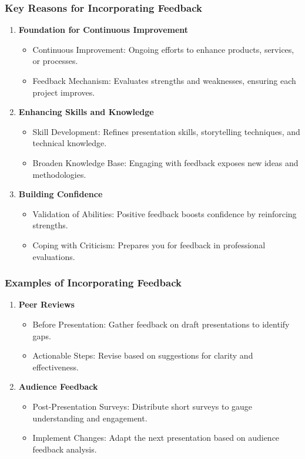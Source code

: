 \documentclass[aspectratio=169]{beamer}
\begin{document}
\begin{frame}[fragile]
    \frametitle{Key Reasons for Incorporating Feedback}
    \begin{enumerate}
        \item \textbf{Foundation for Continuous Improvement}
            \begin{itemize}
                \item Continuous Improvement: Ongoing efforts to enhance products, services, or processes.
                \item Feedback Mechanism: Evaluates strengths and weaknesses, ensuring each project improves.
            \end{itemize}
        \item \textbf{Enhancing Skills and Knowledge}
            \begin{itemize}
                \item Skill Development: Refines presentation skills, storytelling techniques, and technical knowledge.
                \item Broaden Knowledge Base: Engaging with feedback exposes new ideas and methodologies.
            \end{itemize}
        \item \textbf{Building Confidence}
            \begin{itemize}
                \item Validation of Abilities: Positive feedback boosts confidence by reinforcing strengths.
                \item Coping with Criticism: Prepares you for feedback in professional evaluations.
            \end{itemize}
    \end{enumerate}
\end{frame}

\begin{frame}[fragile]
    \frametitle{Examples of Incorporating Feedback}
    \begin{enumerate}
        \item \textbf{Peer Reviews}
            \begin{itemize}
                \item Before Presentation: Gather feedback on draft presentations to identify gaps.
                \item Actionable Steps: Revise based on suggestions for clarity and effectiveness.
            \end{itemize}
        \item \textbf{Audience Feedback}
            \begin{itemize}
                \item Post-Presentation Surveys: Distribute short surveys to gauge understanding and engagement.
                \item Implement Changes: Adapt the next presentation based on audience feedback analysis.
            \end{itemize}
    \end{enumerate}
\end{frame}
\end{document}

